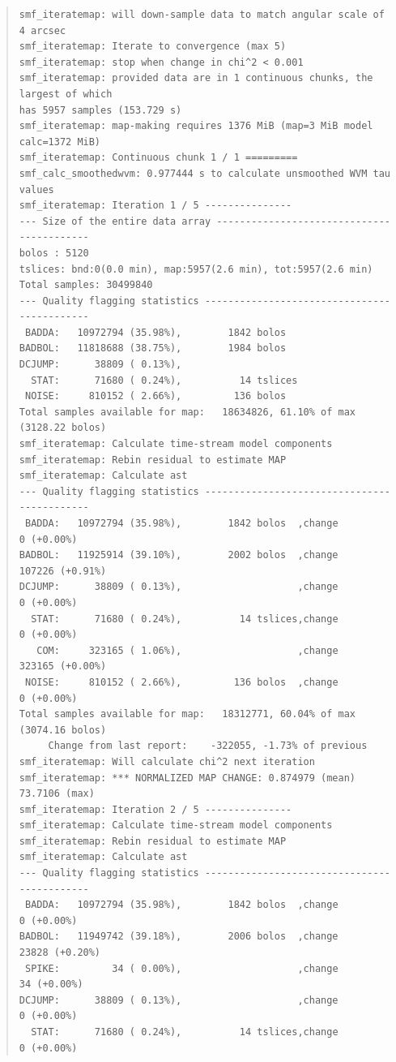 \documentclass[twoside,11pt]{article}
\renewcommand{\_}{\texttt{\symbol{95}}}
\newenvironment{myquote}{\begin{quote}\begin{small}}{\end{small}\end{quote}}
\begin{document}
\begin{myquote}
\begin{verbatim}
smf_iteratemap: will down-sample data to match angular scale of 4 arcsec
smf_iteratemap: Iterate to convergence (max 5)
smf_iteratemap: stop when change in chi^2 < 0.001
smf_iteratemap: provided data are in 1 continuous chunks, the largest of which
has 5957 samples (153.729 s)
smf_iteratemap: map-making requires 1376 MiB (map=3 MiB model calc=1372 MiB)
smf_iteratemap: Continuous chunk 1 / 1 =========
smf_calc_smoothedwvm: 0.977444 s to calculate unsmoothed WVM tau values
smf_iteratemap: Iteration 1 / 5 ---------------
--- Size of the entire data array ------------------------------------------
bolos : 5120
tslices: bnd:0(0.0 min), map:5957(2.6 min), tot:5957(2.6 min)
Total samples: 30499840
--- Quality flagging statistics --------------------------------------------
 BADDA:   10972794 (35.98%),        1842 bolos
BADBOL:   11818688 (38.75%),        1984 bolos
DCJUMP:      38809 ( 0.13%),
  STAT:      71680 ( 0.24%),          14 tslices
 NOISE:     810152 ( 2.66%),         136 bolos
Total samples available for map:   18634826, 61.10% of max (3128.22 bolos)
smf_iteratemap: Calculate time-stream model components
smf_iteratemap: Rebin residual to estimate MAP
smf_iteratemap: Calculate ast
--- Quality flagging statistics --------------------------------------------
 BADDA:   10972794 (35.98%),        1842 bolos  ,change          0 (+0.00%)
BADBOL:   11925914 (39.10%),        2002 bolos  ,change     107226 (+0.91%)
DCJUMP:      38809 ( 0.13%),                    ,change          0 (+0.00%)
  STAT:      71680 ( 0.24%),          14 tslices,change          0 (+0.00%)
   COM:     323165 ( 1.06%),                    ,change     323165 (+0.00%)
 NOISE:     810152 ( 2.66%),         136 bolos  ,change          0 (+0.00%)
Total samples available for map:   18312771, 60.04% of max (3074.16 bolos)
     Change from last report:    -322055, -1.73% of previous
smf_iteratemap: Will calculate chi^2 next iteration
smf_iteratemap: *** NORMALIZED MAP CHANGE: 0.874979 (mean) 73.7106 (max)
smf_iteratemap: Iteration 2 / 5 ---------------
smf_iteratemap: Calculate time-stream model components
smf_iteratemap: Rebin residual to estimate MAP
smf_iteratemap: Calculate ast
--- Quality flagging statistics --------------------------------------------
 BADDA:   10972794 (35.98%),        1842 bolos  ,change          0 (+0.00%)
BADBOL:   11949742 (39.18%),        2006 bolos  ,change      23828 (+0.20%)
 SPIKE:         34 ( 0.00%),                    ,change         34 (+0.00%)
DCJUMP:      38809 ( 0.13%),                    ,change          0 (+0.00%)
  STAT:      71680 ( 0.24%),          14 tslices,change          0 (+0.00%)

\end{verbatim}
\end{myquote}
\end{document}
